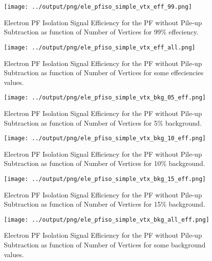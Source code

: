 \documentclass[11pt]{book}
\begin{document}
\begin{figure}[htb]
\centering
\texttt{[image: ../output/png/ele\_pfiso\_simple\_vtx\_eff\_99.png]}
\caption{Electron PF Isolation Signal Efficiency for the PF without Pile-up Subtraction as function of Number of Vertices for 99\% effeciency.}
\label{fig:ele_pfiso_vtx_eff_simple_eff_99}
\end{figure}

\begin{figure}[htb]
\centering
\texttt{[image: ../output/png/ele\_pfiso\_simple\_vtx\_eff\_all.png]}
\caption{Electron PF Isolation Signal Efficiency for the PF without Pile-up Subtraction as function of Number of Vertices for some effeciencies values.}
\label{fig:ele_pfiso_vtx_eff_simple_eff_all}
\end{figure}

\begin{figure}[htb]
\centering
\texttt{[image: ../output/png/ele\_pfiso\_simple\_vtx\_bkg\_05\_eff.png]}
\caption{Electron PF Isolation Signal Efficiency for the PF without Pile-up Subtraction as function of Number of Vertices for 5\% background.}
\label{fig:ele_pfiso_vtx_eff_simple_bkg_05_eff}
\end{figure}

\begin{figure}[htb]
\centering
\texttt{[image: ../output/png/ele\_pfiso\_simple\_vtx\_bkg\_10\_eff.png]}
\caption{Electron PF Isolation Signal Efficiency for the PF without Pile-up Subtraction as function of Number of Vertices for 10\% background.}
\label{fig:ele_pfiso_vtx_eff_simple_bkg_10_eff}
\end{figure}

\begin{figure}[htb]
\centering
\texttt{[image: ../output/png/ele\_pfiso\_simple\_vtx\_bkg\_15\_eff.png]}
\caption{Electron PF Isolation Signal Efficiency for the PF without Pile-up Subtraction as function of Number of Vertices for 15\% background.}
\label{fig:ele_pfiso_vtx_eff_simple_bkg_15_eff}
\end{figure}

\begin{figure}[htb]
\centering
\texttt{[image: ../output/png/ele\_pfiso\_simple\_vtx\_bkg\_all\_eff.png]}
\caption{Electron PF Isolation Signal Efficiency for the PF without Pile-up Subtraction as function of Number of Vertices for some background values.}
\label{fig:ele_pfiso_vtx_eff_simple_bkg_all_eff}
\end{figure}
\clearpage
\end{document}
